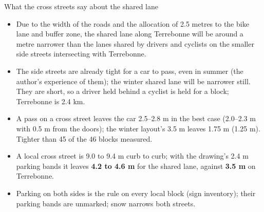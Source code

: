 \documentclass[aspectratio=169,11pt]{beamer}\usetheme{default}\usecolortheme{seahorse}\setbeamertemplate{navigation symbols}{}\setbeamertemplate{footline}[frame number]
\begin{document}
\begin{frame}{What the cross streets say about the shared lane}\begin{itemize}
\item Due to the width of the roads and the allocation of 2.5 metres to the bike lane and buffer zone, the shared lane along Terrebonne will be around a metre narrower than the lanes shared by drivers and cyclists on the smaller side streets intersecting with Terrebonne.
\item The side streets are already tight for a car to pass, even in summer (the author\textquoteright{}s experience of them); the winter shared lane will be narrower still. They are short, so a driver held behind a cyclist is held for a block; Terrebonne is 2.4 km.
\item A pass on a cross street leaves the car 2.5--2.8 m in the best case (2.0--2.3 m with 0.5 m from the doors); the winter layout\textquoteright{}s 3.5 m leaves 1.75 m (1.25 m). Tighter than 45 of the 46 blocks measured.
\item A local cross street is 9.0 to 9.4 m curb to curb; with the drawing\textquoteright{}s 2.4 m parking bands it leaves \textbf{4.2 to 4.6 m} for the shared lane, against \textbf{3.5 m} on Terrebonne.
\item Parking on both sides is the rule on every local block (sign inventory); their parking bands are unmarked; snow narrows both streets.
\end{itemize}\end{frame}
\end{document}
